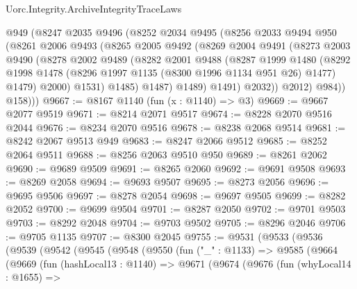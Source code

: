 \begin{lexlean}{Uorc.Integrity.ArchiveIntegrityTraceLaws}
\begin{coremodule}
            @949
            (@8247
              @2035
              @9496
              (@8252
                @2034
                @9495
                (@8256
                  @2033
                  @9494
                  @950
                  (@8261
                    @2006
                    @9493
                    (@8265
                      @2005
                      @9492
                      (@8269
                        @2004
                        @9491
                        (@8273
                          @2003
                          @9490
                          (@8278
                            @2002
                            @9489
                            (@8282
                              @2001
                              @9488
                              (@8287
                                @1999
                                @1480
                                (@8292
                                  @1998
                                  @1478
                                  (@8296 @1997 @1135 (@8300 @1996 @1134 @951 @26) @1477)
                                  @1479)
                                @2000)
                              @1531)
                            @1485)
                          @1487)
                        @1489)
                      @1491)
                    @2032))
                @2012)
              @984))
          @158)))
@9667 := @8167 @1140 (fun (x : @1140) => @3)
@9669 := @9667 @2077 @9519
@9671 := @8214 @2071 @9517
@9674 := @8228 @2070 @9516 @2044
@9676 := @8234 @2070 @9516
@9678 := @8238 @2068 @9514
@9681 := @8242 @2067 @9513 @949
@9683 := @8247 @2066 @9512
@9685 := @8252 @2064 @9511
@9688 := @8256 @2063 @9510 @950
@9689 := @8261 @2062
@9690 := @9689 @9509
@9691 := @8265 @2060
@9692 := @9691 @9508
@9693 := @8269 @2058
@9694 := @9693 @9507
@9695 := @8273 @2056
@9696 := @9695 @9506
@9697 := @8278 @2054
@9698 := @9697 @9505
@9699 := @8282 @2052
@9700 := @9699 @9504
@9701 := @8287 @2050
@9702 := @9701 @9503
@9703 := @8292 @2048
@9704 := @9703 @9502
@9705 := @8296 @2046
@9706 := @9705 @1135
@9707 := @8300 @2045
@9755 := @9531
    (@9533
      (@9536
        (@9539
          (@9542
            (@9545
              (@9548
                (@9550
                  (fun ("_" : @1133) =>
                  @9585
                    (@9664
                      (@9669
                        (fun (hashLocal13 : @1140) =>
                        @9671
                          (@9674
                            (@9676
                              (fun (whyLocal14 : @1655) =>

\end{coremodule}
\end{lexlean}
